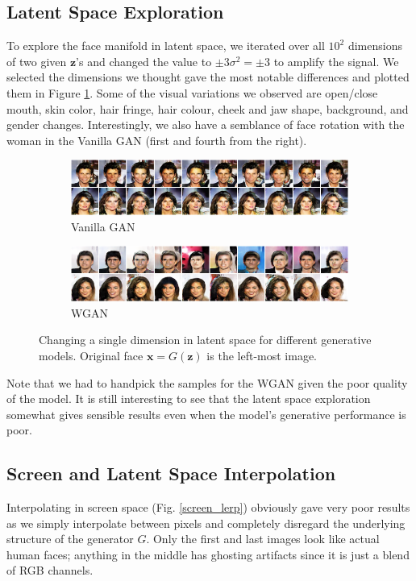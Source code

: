 \documentclass[table]{article}
\def\*#1{\mathbf{#1}}
\begin{document}
\subsection{Latent Space Exploration}
To explore the face manifold in latent space, we iterated over all $10^2$ dimensions of two given $\*z$'s and changed the value to $\pm 3\sigma^2 = \pm 3$ to amplify the signal. We selected the dimensions we thought gave the most notable differences and plotted them in Figure \ref{latent_explore}. Some of the visual variations we observed are open/close mouth, skin color, hair fringe, hair colour, cheek and jaw shape, background, and gender changes. Interestingly, we also have a semblance of face rotation with the woman in the Vanilla GAN (first and fourth from the right).
\begin{figure}[ht]
  \centering
  \begin{subfigure}{\textwidth}
    \centering
    \includegraphics[scale=0.5]{imgs/gan_latent_play}
    \caption{Vanilla GAN}
  \end{subfigure}

  \vspace*{3mm}
  \begin{subfigure}{\textwidth}
    \centering
    \includegraphics[scale=0.5]{imgs/wgan_latent_play}
    \caption{WGAN}
  \end{subfigure}
  \caption{Changing a single dimension in latent space for different generative models. Original face $\*x = G(\*z)$ is the left-most image.}
  \label{latent_explore}
\end{figure}

Note that we had to handpick the samples for the WGAN given the poor quality of the model. It is still interesting to see that the latent space exploration somewhat gives sensible results even when the model's generative performance is poor.

\subsection{Screen and Latent Space Interpolation}
Interpolating in screen space (Fig. \ref{screen_lerp}) obviously gave very poor results as we simply interpolate between pixels and completely disregard the underlying structure of the generator $G$. Only the first and last images look like actual human faces; anything in the middle has ghosting artifacts since it is just a blend of RGB channels.
\end{document}
